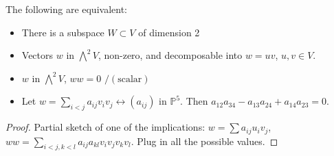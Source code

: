 \documentclass [letterpaper,11pt,twoside]{article}
\begin{document}
  \begin{prop*} The following are equivalent:
    \begin{itemize}
      \item There is a subspace $W\subset V$ of dimension 2
      \item Vectors $w$ in $\bigwedge^2 V$, non-zero, and decomposable into $w = uv$, $u, v\in V$.
      \item $w$ in $\bigwedge^2 V$, $ww = 0$ $\big/ (\text{scalar})$
      \item Let $w = \sum\limits_{i<j} a_{ij}v_iv_j \longleftrightarrow (a_{ij})$ in $\mathbb P^5$.  Then $a_{12}a_{34} - a_{13}a_{24} + a_{14}a_{23} = 0$.
    \end{itemize}
  \end{prop*}
  \begin{proof}
    Partial sketch of one of the implications: $w = \sum a_{ij} u_i v_j$, $ww = \sum\limits_{i<j,k<l} a_{ij}a_{kl}v_iv_jv_kv_l$.  Plug in all the possible values.
  \end{proof}
\end{document}
